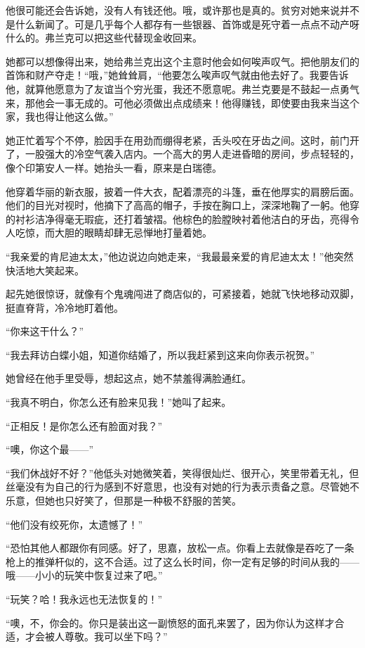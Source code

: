 \par 他很可能还会告诉她，没有人有钱还他。哦，或许那也是真的。贫穷对她来说并不是什么新闻了。可是几乎每个人都存有一些银器、首饰或是死守着一点点不动产呀什么的。弗兰克可以把这些代替现金收回来。
\par 她都可以想像得出来，她给弗兰克出这个主意时他会如何唉声叹气。把他朋友们的首饰和财产夺走！“哦，”她耸耸肩，“他要怎么唉声叹气就由他去好了。我要告诉他，就算他愿意为了友谊当个穷光蛋，我还不愿意呢。弗兰克要是不鼓起一点勇气来，那他会一事无成的。可他必须做出点成绩来！他得赚钱，即使要由我来当这个家，我也得让他这么做。”
\par 她正忙着写个不停，脸因手在用劲而绷得老紧，舌头咬在牙齿之间。这时，前门开了，一股强大的冷空气袭入店内。一个高大的男人走进昏暗的房间，步点轻轻的，像个印第安人一样。她抬头一看，原来是白瑞德。
\par 他穿着华丽的新衣服，披着一件大衣，配着漂亮的斗篷，垂在他厚实的肩膀后面。他们的目光对视时，他摘下了高高的帽子，手按在胸口上，深深地鞠了一躬。他穿的衬衫洁净得毫无瑕疵，还打着皱褶。他棕色的脸膛映衬着他洁白的牙齿，亮得令人吃惊，而大胆的眼睛却肆无忌惮地打量着她。
\par “我亲爱的肯尼迪太太，”他边说边向她走来，“我最最亲爱的肯尼迪太太！”他突然快活地大笑起来。
\par 起先她很惊讶，就像有个鬼魂闯进了商店似的，可紧接着，她就飞快地移动双脚，挺直脊背，冷冷地盯着他。
\par “你来这干什么？”
\par “我去拜访白蝶小姐，知道你结婚了，所以我赶紧到这来向你表示祝贺。”
\par 她曾经在他手里受辱，想起这点，她不禁羞得满脸通红。
\par “我真不明白，你怎么还有脸来见我！”她叫了起来。
\par “正相反！是你怎么还有脸面对我？”
\par “噢，你这个最——”
\par “我们休战好不好？”他低头对她微笑着，笑得很灿烂、很开心，笑里带着无礼，但丝毫没有为自己的行为感到不好意思，也没有对她的行为表示责备之意。尽管她不乐意，但她也只好笑了，但那是一种极不舒服的苦笑。
\par “他们没有绞死你，太遗憾了！”
\par “恐怕其他人都跟你有同感。好了，思嘉，放松一点。你看上去就像是吞吃了一条枪上的推弹杆似的，这不合适。过了这么长时间，你一定有足够的时间从我的——哦——小小的玩笑中恢复过来了吧。”
\par “玩笑？哈！我永远也无法恢复的！”
\par “噢，不，你会的。你只是装出这一副愤怒的面孔来罢了，因为你认为这样才合适，才会被人尊敬。我可以坐下吗？”
